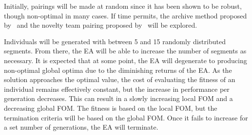 \documentclass{article}
\begin{document}
Initially, pairings will be made at random since it has been shown to be robust, though non-optimal in many cases. If time permits, the archive method proposed by~\cite{ref:Panait2006} and the novelty team pairing proposed by~\cite{ref:Gomes2014} will be explored.



Individuals will be generated with between 5 and 15 randomly distributed segments. From there, the EA will be able to increase the number of segments as necessary. It is expected that at some point, the EA will degenerate to producing non-optimal global optima due to the diminishing returns of the EA. As the solution approaches the optimal value, the cost of evaluating the fitness of an individual remains effectively constant, but the increase in performance per generation decreases. This can result in a slowly increasing local FOM and a decreasing global FOM. The fitness is based on the local FOM, but the termination criteria will be based on the global FOM. Once it fails to increase for a set number of generations, the EA will terminate.





\end{document}
